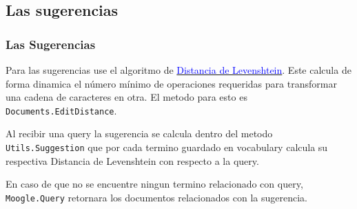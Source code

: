\documentclass[11pt]{beamer}
\begin{document}
\subsection{Las sugerencias}

\begin{frame}[fragile]
    \frametitle{Las Sugerencias}
    
    Para las sugerencias use el algoritmo de \href{https://es.wikipedia.org/wiki/Distancia_de_Levenshtein}{\textcolor{blue}{Distancia de Levenshtein}}. Este calcula de forma dinamica el número mínimo de operaciones requeridas para transformar una cadena de caracteres en otra. El metodo para esto es \texttt{Documents.EditDistance}.\linebreak

    Al recibir una query la sugerencia se calcula dentro del metodo \texttt{Utils.Suggestion} que por cada termino guardado en vocabulary calcula su respectiva Distancia de Levenshtein con respecto a la query.\linebreak

    En caso de que no se encuentre ningun termino relacionado con query, \texttt{Moogle.Query} retornara los documentos relacionados con la sugerencia.
\end{frame}
\end{document}
